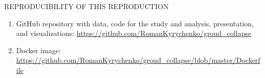 \documentclass[11pt, aspectratio=169]{beamer}
\begin{document}
\begin{frame}{\MakeUppercase{Reproducibility of This Reproduction}}

    \begin{enumerate}
        \item GitHub repository with data, code for the study and analysis, presentation, and visualizations: \url{https://github.com/RomanKyrychenko/groud_collapse}
        \item Docker image: \url{https://github.com/RomanKyrychenko/groud_collapse/blob/master/Dockerfile}
    \end{enumerate}

\end{frame}
\end{document}
